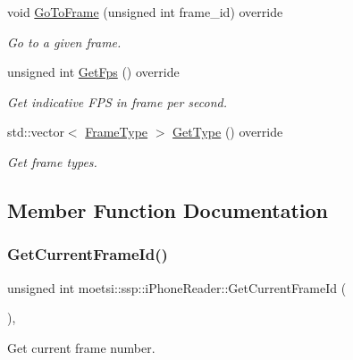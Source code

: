 \begin{DoxyCompactItemize}
void \hyperlink{classmoetsi_1_1ssp_1_1iPhoneReader_a27b6dea97e4c4db8e4e749cc9e30e7ca}{Go\+To\+Frame} (unsigned int frame\+\_\+id) override
\begin{DoxyCompactList}\small\item\em Go to a given frame. \end{DoxyCompactList}\item 
unsigned int \hyperlink{classmoetsi_1_1ssp_1_1iPhoneReader_a4bb216847a6c2ed8eb5d31788a0b8477}{Get\+Fps} () override
\begin{DoxyCompactList}\small\item\em Get indicative F\+PS in frame per second. \end{DoxyCompactList}\item 
std\+::vector$<$ \hyperlink{namespacemoetsi_1_1ssp_a46efdfa2cd5a28ead465dcc8006b5a87}{Frame\+Type} $>$ \hyperlink{classmoetsi_1_1ssp_1_1iPhoneReader_a05d285ace85fc570bc2f453a0862ae56}{Get\+Type} () override
\begin{DoxyCompactList}\small\item\em Get frame types. \end{DoxyCompactList}\end{DoxyCompactItemize}


\subsection{Member Function Documentation}
\mbox{\label{classmoetsi_1_1ssp_1_1iPhoneReader_a78792c6319743aed3ef2afc96fe16485}} 
\subsubsection{\texorpdfstring{Get\+Current\+Frame\+Id()}{GetCurrentFrameId()}}
{\footnotesize\ttfamily unsigned int moetsi\+::ssp\+::i\+Phone\+Reader\+::\+Get\+Current\+Frame\+Id (\begin{DoxyParamCaption}{ }\end{DoxyParamCaption})\hspace{0.3cm}{\ttfamily [override]}, {\ttfamily [virtual]}}



Get current frame number. 

